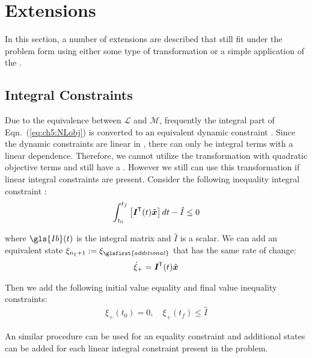 \section{Extensions} \label{sec:ch5:extensions}

In this section, a number of extensions are described that still fit under the \lqdo{} problem form using either some type of transformation or a simple application of the \apgp.

\subsection{Integral Constraints} \label{sec:ch5:integral:constraints}

Due to the equivalence between $\mathcal{L}$ and $\mathcal{M}$, frequently the integral part of Eqn.~(\ref{eq:ch5:NLobj}) is converted to an equivalent dynamic constraint \cite{Bryson1975a, Betts2010a, Stryk1999a}. 
Since the dynamic constraints are linear in \lqdo, there can only be integral terms with a linear dependence. 
Therefore, we cannot utilize the transformation with quadratic objective terms and still have a \qp.
However we still can use this transformation if linear integral constraints are present.
Consider the following inequality integral constraint \cite{Stryk1999a}:
\begin{align}
\int_{t_0}^{t_f} \left[ \bm{I}^{\mkern-1.5mu\mathsf{T}}(t) \tilde{\bm{x}} \right] dt - \hat{I} \leq  0
\end{align}

\noindent where $\gls{Ib}(t)$ is the integral matrix and $\hat{I}$ is a scalar. We can add an equivalent state $\xi_{n_{\xi}+1} := \xi_{\glsfirst{additional}}$ that has the same rate of change:
\begin{align}
\dot{\xi}_+ = \bm{I}^{\mkern-1.5mu\mathsf{T}}(t) \tilde{\bm{x}}
\end{align}

\noindent Then we add the following initial value equality and final value inequality constraints:
\begin{align}
\xi_+(t_0) = 0, \quad \xi_+(t_f) \leq \hat{I} 
\end{align}

\noindent An similar procedure can be used for an equality constraint and additional states can be added for each linear integral constraint present in the problem.

